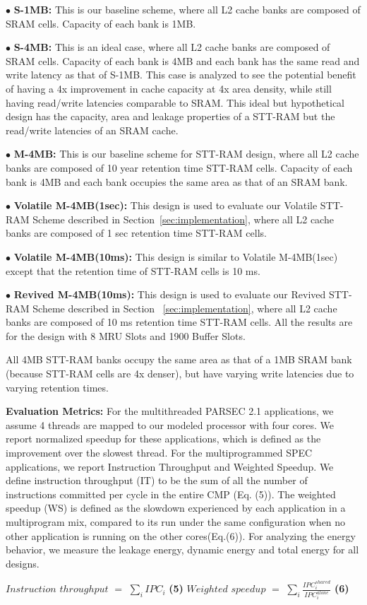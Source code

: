 
$\bullet$ {\bf S-1MB:} This is our baseline scheme, where all L2 cache banks are
composed of SRAM cells. Capacity of each bank is 1MB.

$\bullet$ {\bf S-4MB:} This is an ideal case, where all L2 cache banks
are composed of SRAM cells. Capacity of each bank is 4MB and each bank
has the same read and write latency as that of S-1MB. This case is analyzed to see the potential benefit
of having a 4x improvement in cache capacity at 4x area density, while still having read/write latencies comparable to SRAM.
This ideal but hypothetical design has the capacity, area and leakage properties of a STT-RAM but the read/write latencies of an SRAM cache.

$\bullet$ {\bf M-4MB:} This is our baseline scheme for STT-RAM design, where
all L2 cache banks are composed of 10 year retention time STT-RAM cells.
Capacity of each bank is 4MB and each bank occupies the same area as that of an SRAM bank.

$\bullet$ {\bf Volatile M-4MB(1sec):} This design is used to evaluate our
 Volatile STT-RAM Scheme described in Section~\ref{sec:implementation}, where all L2 cache
banks are composed of 1 sec retention time STT-RAM cells.

$\bullet$ {\bf Volatile M-4MB(10ms):} This design is similar to Volatile M-4MB(1sec)
except that the retention time of STT-RAM cells is 10 ms.

$\bullet$ {\bf Revived M-4MB(10ms):} This design is used to evaluate our
 Revived STT-RAM Scheme described in Section ~\ref{sec:implementation}, where all L2 cache
banks are composed of 10 ms retention time STT-RAM cells. All the
results are for the design with 8 MRU Slots and 1900 Buffer Slots.

All 4MB STT-RAM banks occupy the same area as that of a 1MB SRAM bank (because STT-RAM cells are 4x denser), but have varying write latencies due to varying retention times.

\noindent\textbf{ Evaluation Metrics:}
For the multithreaded PARSEC 2.1 applications, we assume 4 threads are mapped to our modeled
processor with four cores. We report normalized speedup for these applications,
which is defined as the improvement over the slowest thread.
For the multiprogrammed SPEC applications, we report Instruction Throughput and Weighted Speedup.
We define instruction throughput (IT) to be the sum of all the number of instructions committed
per cycle in the entire CMP (Eq. (5)).  The weighted speedup (WS) is defined as the slowdown experienced
by each application in a multiprogram mix, compared to its run under the same
configuration when no other application is running on the other cores(Eq.(6)). For analyzing the energy behavior, we measure the leakage energy, dynamic energy and total energy for all designs.

{
 $Instruction$ $throughput$ $=$ $\displaystyle\sum_{i} IPC_{i}$ \hspace{1mm} \textbf{(5)} \hspace{4mm}
 $Weighted$ $speedup$ $=$ $\displaystyle\sum_{i}
\frac{IPC_{i}^{shared}}{IPC_{i}^{alone}}$ \hspace{1mm} \textbf{(6)}
}




